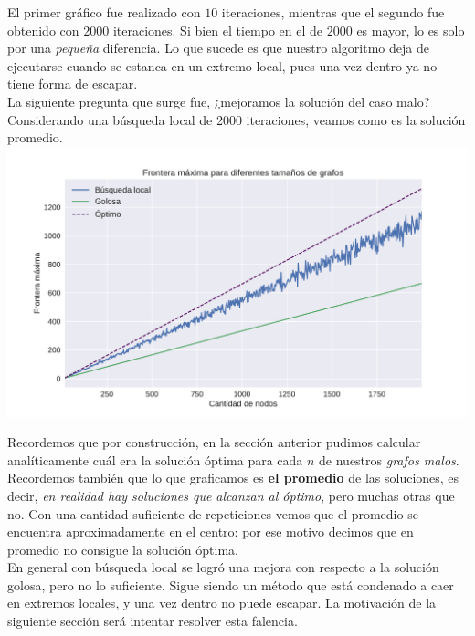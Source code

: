 El primer gráfico fue realizado con $10$ iteraciones, mientras que el segundo fue obtenido con $2000$ iteraciones. Si bien el tiempo en el de $2000$ es mayor, lo es solo por una \textit{pequeña} diferencia. Lo que sucede es que nuestro algoritmo deja de ejecutarse cuando se estanca en un extremo local, pues una vez dentro ya no tiene forma de escapar. \\

La siguiente pregunta que surge fue, ¿mejoramos la solución del caso malo? Considerando una búsqueda local de 2000 iteraciones, veamos como es la solución promedio. \\

{\centering
    \includegraphics[width=1\textwidth]{informe/imgs/exp_malo_frontera_greedy_local_2000_optimo.pdf}
}

Recordemos que por construcción, en la sección anterior pudimos calcular analíticamente cuál era la solución óptima para cada $n$ de nuestros \textit{grafos malos}. Recordemos también que lo que graficamos es \textbf{el promedio} de las soluciones, es decir, \textit{en realidad hay soluciones que alcanzan al óptimo}, pero muchas otras que no. Con una cantidad suficiente de repeticiones vemos que el promedio se encuentra aproximadamente en el centro: por ese motivo decimos que en promedio no consigue la solución óptima. \\

En general con búsqueda local se logró una mejora con respecto a la solución golosa, pero no lo suficiente. Sigue siendo un método que está condenado a caer en extremos locales, y una vez dentro no puede escapar. La motivación de la siguiente sección será intentar resolver esta falencia.

